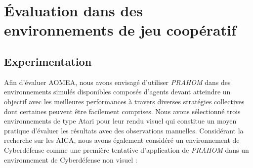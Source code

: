 \documentclass[contribution]{jfsma}
\begin{document}


\section{Évaluation dans des environnements de jeu coopératif}


\subsection{Experimentation}

Afin d'évaluer AOMEA, nous avons envisagé d'utiliser \emph{PRAHOM} dans des environnements simulés disponibles composés d'agents devant atteindre un objectif avec les meilleures performances à travers diverses stratégies collectives dont certaines peuvent être facilement comprises.
Nous avons sélectionné trois environnements de type Atari pour leur rendu visuel qui constitue un moyen pratique d'évaluer les résultats avec des observations manuelles\footnotemark[1].
Considérant la recherche sur les AICA, nous avons également considéré un environnement de Cyberdéfense comme une première tentative d'application de \emph{PRAHOM} dans un environnement de Cyberdéfense non visuel :

\end{document}
